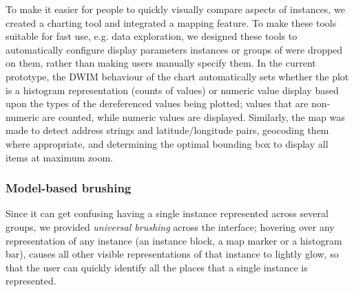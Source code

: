 \documentclass{sigchi}
\begin{document}
To make it easier for people to quickly visually compare aspects of instances, we created a charting tool and integrated a mapping feature.  To make these tools suitable for fast use, e.g. data exploration, we designed these tools to automatically configure display parameters instances or groups of were dropped on them, rather than making users manually specify them. In the current prototype, the DWIM behaviour of the chart automatically sets whether the plot is a histogram representation (counts of values) or numeric value display based upon the types of the dereferenced values being plotted; values that are non-numeric are counted, while numeric values are displayed.    Similarly, the map was made to detect address strings and latitude/longitude pairs, geocoding them where appropriate, and determining the optimal bounding box to display all items at maximum zoom.

\subsubsection{Model-based brushing}
Since it can get confusing having a single instance represented across several groups, we provided \emph{universal brushing} across the interface; hovering over any representation of any instance (an instance block, a map marker or a histogram bar), causes all other visible representations of that instance to lightly glow, so that the user can quickly identify all the places that a single instance is represented.



\end{document}
